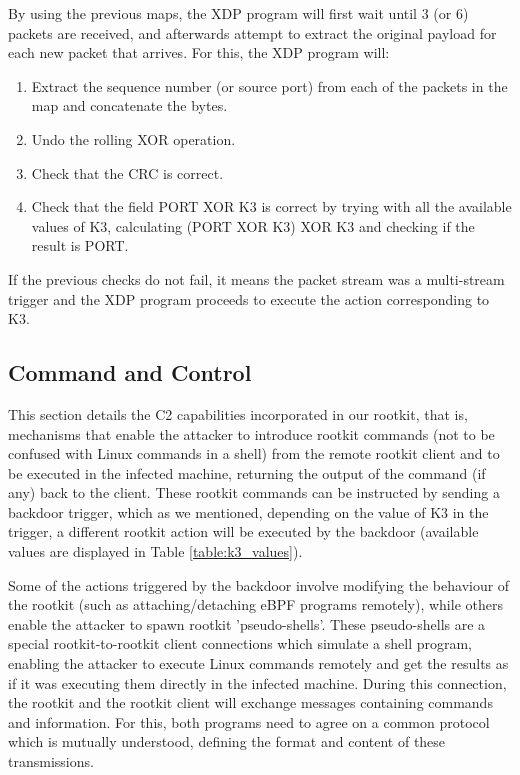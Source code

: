 By using the previous maps, the XDP program will first wait until 3 (or 6) packets are received, and afterwards attempt to extract the original payload for each new packet that arrives. For this, the XDP program will:
\begin{enumerate}
\item Extract the sequence number (or source port) from each of the packets in the map and concatenate the bytes.
\item Undo the rolling XOR operation.
\item Check that the CRC is correct.
\item Check that the field PORT XOR K3 is correct by trying with all the available values of K3, calculating (PORT XOR K3) XOR K3 and checking if the result is PORT.
\end{enumerate}

If the previous checks do not fail, it means the packet stream was a multi-stream trigger and the XDP program proceeds to execute the action corresponding to K3.


\subsection{Command and Control} \label{subsection:c2}
This section details the C2 capabilities incorporated in our rootkit, that is, mechanisms that enable the attacker to introduce rootkit commands (not to be confused with Linux commands in a shell) from the remote rootkit client and to be executed in the infected machine, returning the output of the command (if any) back to the client. These rootkit commands can be instructed by sending a backdoor trigger, which as we mentioned, depending on the value of K3 in the trigger, a different rootkit action will be executed by the backdoor (available values are displayed in Table \ref{table:k3_values}).

Some of the actions triggered by the backdoor involve modifying the behaviour of the rootkit (such as attaching/detaching eBPF programs remotely), while others enable the attacker to spawn rootkit 'pseudo-shells'. These pseudo-shells are a special rootkit-to-rootkit client connections which simulate a shell program, enabling the attacker to execute Linux commands remotely and get the results as if it was executing them directly in the infected machine. During this connection, the rootkit and the rootkit client will exchange messages containing commands and information. For this, both programs need to agree on a common protocol which is mutually understood, defining the format and content of these transmissions.

